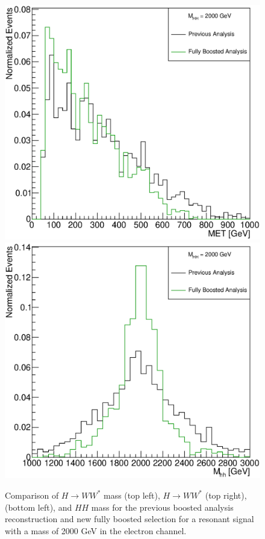 \begin{figure}[h]
\begin{center}
\includegraphics[scale=0.33]{figures/WHad_plots_john_withcuts/electron/wlep_met_Xhh2000}
\includegraphics[scale=0.33]{figures/WHad_plots_john_withcuts/electron/hh_m_Xhh2000}
\caption{Comparison of ${H\rightarrow WW^{*}}$ mass (top left), ${H\rightarrow WW^{*}}$ \pt (top right), \met (bottom left), and $HH$ mass for the  previous boosted analysis reconstruction and new fully boosted selection for a resonant signal with a mass of 2000 GeV in the electron channel.}
\label{fig:elec_sel}
\end{center}
\end{figure}

